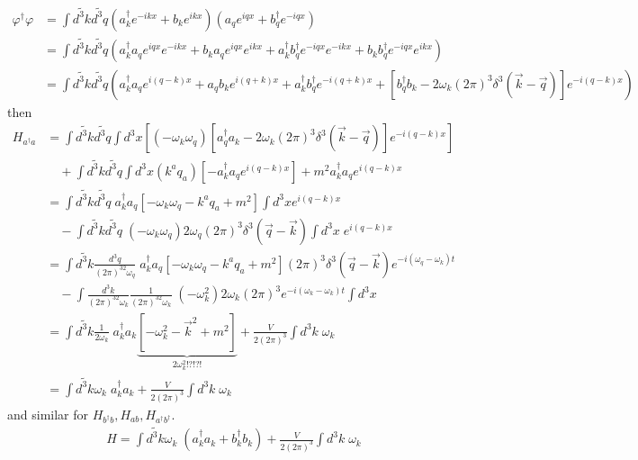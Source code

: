 \documentclass[10pt,a4paper]{article}
\theoremstyle{definition}
\begin{document}
\begin{align}
\varphi^\dagger\varphi&=\int\widetilde{d^3k}\widetilde{d^3q}\left(a^\dagger_ke^{-ikx}+b_ke^{ikx}\right)\left(a_qe^{iqx}+b^\dagger_qe^{-iqx}\right)\\
&=\int\widetilde{d^3k}\widetilde{d^3q}\left(a^\dagger_ka_qe^{iqx}e^{-ikx}+b_ka_qe^{iqx}e^{ikx}+a^\dagger_kb^\dagger_qe^{-iqx}e^{-ikx}+b_kb^\dagger_qe^{-iqx}e^{ikx}\right)\\
&=\int\widetilde{d^3k}\widetilde{d^3q}\left(a^\dagger_ka_qe^{i(q-k)x}+a_qb_ke^{i(q+k)x}+a^\dagger_kb^\dagger_qe^{-i(q+k)x}+[b^\dagger_qb_k-2\omega_k(2\pi)^3\delta^3(\vec{k}-\vec{q})]e^{-i(q-k)x}\right)
\end{align}
then
\begin{align}
H_{a^\dagger a}&=\int\widetilde{d^3k}\widetilde{d^3q}\int d^3x\left[(-\omega_k\omega_q)[a^\dagger_qa_k-2\omega_k(2\pi)^3\delta^3(\vec{k}-\vec{q})]e^{-i(q-k)x}\right]\\
&\quad+\int\widetilde{d^3k}\widetilde{d^3q}\int d^3x(k^aq_a)\left[-a^\dagger_ka_qe^{i(q-k)x}\right]+m^2a^\dagger_ka_qe^{i(q-k)x}\\
&=\int\widetilde{d^3k}\widetilde{d^3q}\;a^\dagger_ka_q\left[-\omega_k\omega_q-k^aq_a+m^2\right]\int d^3xe^{i(q-k)x}\\
&\quad-\int\widetilde{d^3k}\widetilde{d^3q}\;(-\omega_k\omega_q)2\omega_q(2\pi)^3\delta^3(\vec{q}-\vec{k})\int d^3x\;e^{i(q-k)x}\\
&=\int\widetilde{d^3k}\frac{d^3q}{(2\pi)^32\omega_q}\;a^\dagger_ka_q\left[-\omega_k\omega_q-k^aq_a+m^2\right](2\pi)^3\delta^3(\vec{q}-\vec{k})e^{-i(\omega_q-\omega_k)t}\\
&\quad-\int\frac{d^3k}{(2\pi)^32\omega_k}\frac{1}{(2\pi)^32\omega_k}\;(-\omega_k^2)2\omega_k(2\pi)^3e^{-i(\omega_k-\omega_k)t}\int d^3x \\
&=\int\widetilde{d^3k}\frac{1}{2\omega_k}\;a^\dagger_ka_k\underbrace{\left[-\omega^2_k-\vec{k}^2+m^2\right]}_{2\omega_k^2!?!?!}+\frac{V}{2(2\pi)^3}\int d^3k\;\omega_k\\
&=\int\widetilde{d^3k}\omega_k\;a^\dagger_ka_k+\frac{V}{2(2\pi)^3}\int d^3k\;\omega_k
\end{align}
and similar for $H_{b^\dagger b},H_{ab},H_{a^\dagger b^\dagger}$.
\begin{align}
H=\int\widetilde{d^3k}\omega_k\;(a^\dagger_ka_k+b^\dagger_kb_k)+\frac{V}{2(2\pi)^3}\int d^3k\;\omega_k
\end{align}
\end{document}
